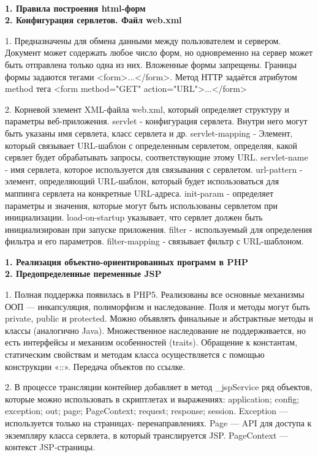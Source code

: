 \documentclass{article}
\begin{document}
\\
\begin{minipage}{.3\textwidth}
    \textbf{1. Правила построения html-форм}\\
    \textbf{2. Конфигурация сервлетов. Файл web.xml}

1. Предназначены для обмена данными между пользователем и сервером. Документ может содержать любое число форм, но одновременно на сервер может быть отправлена только одна из них.
Вложенные формы запрещены. Границы формы задаются тегами <form>...</form>. Метод НТТР задаётся атрибутом method тега <form method="GET" action="URL">...</form>

2. Корневой элемент XML-файла web.xml, который определяет структуру и параметры веб-приложения. servlet - конфигурация сервлета. Внутри него могут быть указаны имя сервлета, класс сервлета и др. servlet-mapping - Элемент, который связывает URL-шаблон с определенным сервлетом, определяя, какой сервлет будет обрабатывать запросы, соответствующие этому URL.
servlet-name - имя сервлета, которое используется для связывания с сервлетом. url-pattern - элемент, определяющий URL-шаблон, который будет использоваться для маппинга сервлета на конкретные URL-адреса. init-param -  определяет параметры и значения, которые могут быть использованы сервлетом при инициализации.
load-on-startup указывает, что сервлет должен быть инициализирован при запуске приложения. 
filter - используемый для определения фильтра и его параметров. filter-mapping - связывает фильтр с URL-шаблоном.
\end{minipage}
\hfill
\begin{minipage}{.3\textwidth}
    \textbf{1. Реализация объектно-ориентированных программ в PHP}\\
    \textbf{2. Предопределенные переменные JSP}

1. Полная поддержка появилась в PHP5. Реализованы все основные механизмы ООП — инкапсуляция, полиморфизм и наследование. 
Поля и методы могут быть private, public и protected. Можно объявлять финальные и абстрактные методы и классы (аналогично Java).
Множественное наследование не поддерживается, но есть интерфейсы и механизм особенностей (traits). Обращение к константам, статическим свойствам и методам класса осуществляется с помощью конструкции «::». Передача объектов по ссылке.

2. В процессе трансляции контейнер добавляет в метод \_jspService ряд объектов, которые можно использовать в скриптлетах и выражениях: application; config; exception; out; page; PageContext; request; response; session.
Exception — используется только на страницах- перенаправлениях.
Page — API для доступа к экземпляру класса сервлета, в который транслируется JSP.
PageContext — контекст JSP-страницы.
\end{minipage}
\end{document}

